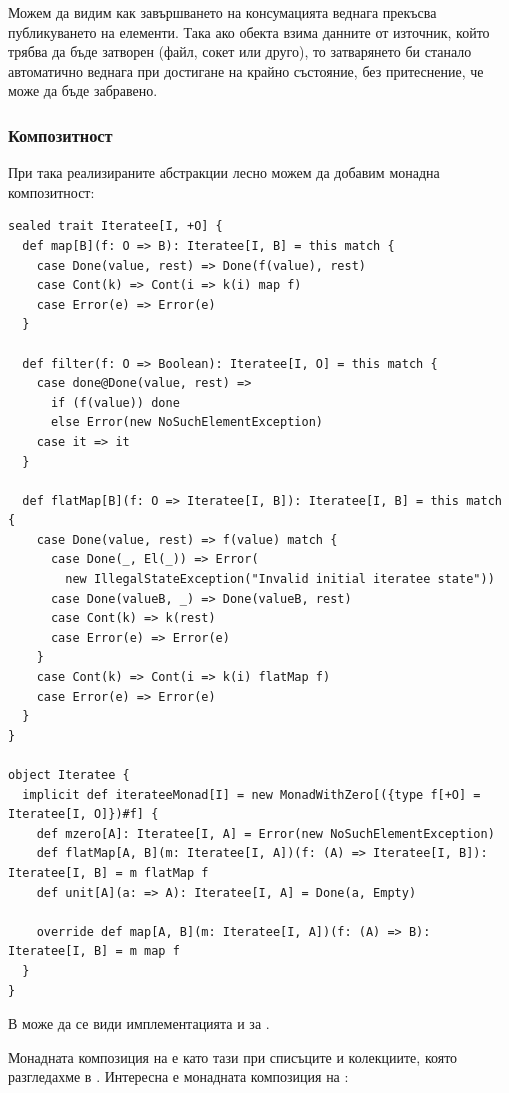 Можем да видим как завършването на консумацията веднага прекъсва публикуването на елементи. Така ако  обекта взима данните от източник, който трябва да бъде затворен (файл, сокет или друго), то затварянето би станало автоматично веднага при достигане на крайно състояние, без притеснение, че може да бъде забравено.

\subsubsection{Композитност}

При така реализираните абстракции лесно можем да добавим монадна композитност:

\begin{lstlisting}
sealed trait Iteratee[I, +O] {
  def map[B](f: O => B): Iteratee[I, B] = this match {
    case Done(value, rest) => Done(f(value), rest)
    case Cont(k) => Cont(i => k(i) map f)
    case Error(e) => Error(e)
  }
  
  def filter(f: O => Boolean): Iteratee[I, O] = this match {
    case done@Done(value, rest) =>
      if (f(value)) done
      else Error(new NoSuchElementException)
    case it => it
  }
  
  def flatMap[B](f: O => Iteratee[I, B]): Iteratee[I, B] = this match {
    case Done(value, rest) => f(value) match {
      case Done(_, El(_)) => Error(
        new IllegalStateException("Invalid initial iteratee state"))
      case Done(valueB, _) => Done(valueB, rest)
      case Cont(k) => k(rest)
      case Error(e) => Error(e)
    }
    case Cont(k) => Cont(i => k(i) flatMap f)
    case Error(e) => Error(e)
  }
}

object Iteratee {
  implicit def iterateeMonad[I] = new MonadWithZero[({type f[+O] = Iteratee[I, O]})#f] {
    def mzero[A]: Iteratee[I, A] = Error(new NoSuchElementException)
    def flatMap[A, B](m: Iteratee[I, A])(f: (A) => Iteratee[I, B]): Iteratee[I, B] = m flatMap f
    def unit[A](a: => A): Iteratee[I, A] = Done(a, Empty)
    
    override def map[A, B](m: Iteratee[I, A])(f: (A) => B): Iteratee[I, B] = m map f
  }
}
\end{lstlisting}

В  може да се види имплементацията и за . 

Монадната композиция на  е като тази при списъците и колекциите, която разгледахме в . Интересна е монадната композиция на :

